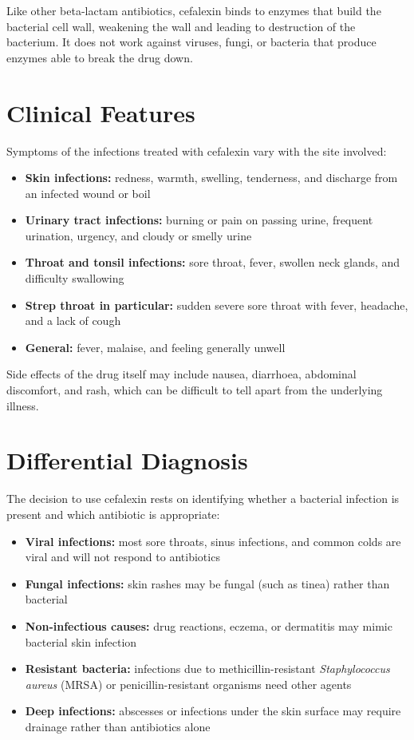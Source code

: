 Like other beta-lactam antibiotics, cefalexin binds to enzymes that build the bacterial cell wall, weakening the wall and leading to destruction of the bacterium. It does not work against viruses, fungi, or bacteria that produce enzymes able to break the drug down.

\section*{Clinical Features}
Symptoms of the infections treated with cefalexin vary with the site involved:

\begin{itemize}
    \item \textbf{Skin infections:} redness, warmth, swelling, tenderness, and discharge from an infected wound or boil
    \item \textbf{Urinary tract infections:} burning or pain on passing urine, frequent urination, urgency, and cloudy or smelly urine
    \item \textbf{Throat and tonsil infections:} sore throat, fever, swollen neck glands, and difficulty swallowing
    \item \textbf{Strep throat in particular:} sudden severe sore throat with fever, headache, and a lack of cough
    \item \textbf{General:} fever, malaise, and feeling generally unwell
\end{itemize}

Side effects of the drug itself may include nausea, diarrhoea, abdominal discomfort, and rash, which can be difficult to tell apart from the underlying illness.

\section*{Differential Diagnosis}
The decision to use cefalexin rests on identifying whether a bacterial infection is present and which antibiotic is appropriate:

\begin{itemize}
    \item \textbf{Viral infections:} most sore throats, sinus infections, and common colds are viral and will not respond to antibiotics
    \item \textbf{Fungal infections:} skin rashes may be fungal (such as tinea) rather than bacterial
    \item \textbf{Non-infectious causes:} drug reactions, eczema, or dermatitis may mimic bacterial skin infection
    \item \textbf{Resistant bacteria:} infections due to methicillin-resistant \textit{Staphylococcus aureus} (MRSA) or penicillin-resistant organisms need other agents
    \item \textbf{Deep infections:} abscesses or infections under the skin surface may require drainage rather than antibiotics alone
\end{itemize}

